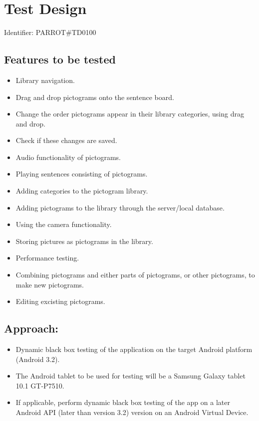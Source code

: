 
\section{Test Design}

Identifier: PARROT\#TD0100

\subsection*{Features to be tested}
\begin{itemize}
	\item Library navigation.
	\item Drag and drop pictograms onto the sentence board.
	\item Change the order pictograms appear in their library categories, using drag and drop.
	\item Check if these changes are saved.
	\item Audio functionality of pictograms.
	\item Playing sentences consisting of pictograms.
	\item Adding categories to the pictogram library.
	\item Adding pictograms to the library through the server/local database.
	\item Using the camera functionality.
	\item Storing pictures as pictograms in the library.
	\item Performance testing.
	\item Combining pictograms and either parts of pictograms, or other pictograms, to make new pictograms.
	\item Editing excisting pictograms.
\end{itemize}

\subsection*{Approach:}
\begin{itemize}
	\item Dynamic black box testing of the application on the target Android platform (Android 3.2).
	\item The Android tablet to be used for testing will be a Samsung Galaxy tablet 10.1 GT-P7510.
	\item If applicable, perform dynamic black box testing of the app on a later Android API (later than version 3.2) version on an  Android Virtual Device.
\end{itemize}


